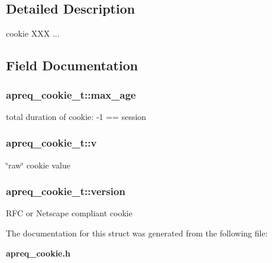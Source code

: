 \subsection{Detailed Description}
cookie XXX ... 



\subsection{Field Documentation}
\subsubsection{ apreq\_\-cookie\_\-t::max\_\-age}\label{structapreq__cookie__t_m7}


total duration of cookie: -1 == session 
\subsubsection{ apreq\_\-cookie\_\-t::v}\label{structapreq__cookie__t_m8}


\char`\"{}raw\char`\"{} cookie value 
\subsubsection{ apreq\_\-cookie\_\-t::version}\label{structapreq__cookie__t_m0}


RFC or Netscape compliant cookie 

The documentation for this struct was generated from the following file:\begin{CompactItemize}
\item 
{\bf apreq\_\-cookie.h}\end{CompactItemize}
